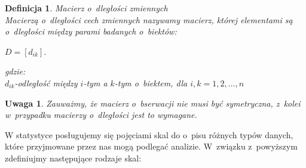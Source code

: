 \documentclass[12pt,a4paper]{report}
\newtheorem{definition}[theorem]{Definicja}
\newtheorem{uwaga}{Uwaga}
\begin{document}
\begin{definition}{Macierz o~dległości zmiennych \cite[Rozdział 1.6]{panek2013}}\\
Macierzą o~dległości cech zmiennych nazywamy macierz, której elementami są o~dległości między parami badanych o~biektów: 
\begin{center}
$D = [d_{ik}].$
\end{center}
gdzie:\\
$d_{ik}$-odległość między $i$-tym a $k$-tym o~biektem, dla $i,k=1,2,\ldots,n$
\end{definition}

\begin{uwaga}
Zauważmy, że macierz o~bserwacji nie musi być symetryczna, z~kolei w~przypadku macierzy o~dległości jest to wymagane.
\end{uwaga}

W statystyce posługujemy się pojęciami skal do o~pisu różnych typów danych, które przyjmowane przez nas mogą podlegać analizie. W~związku z~powyższym zdefiniujmy następujące rodzaje skal:
\end{document}
